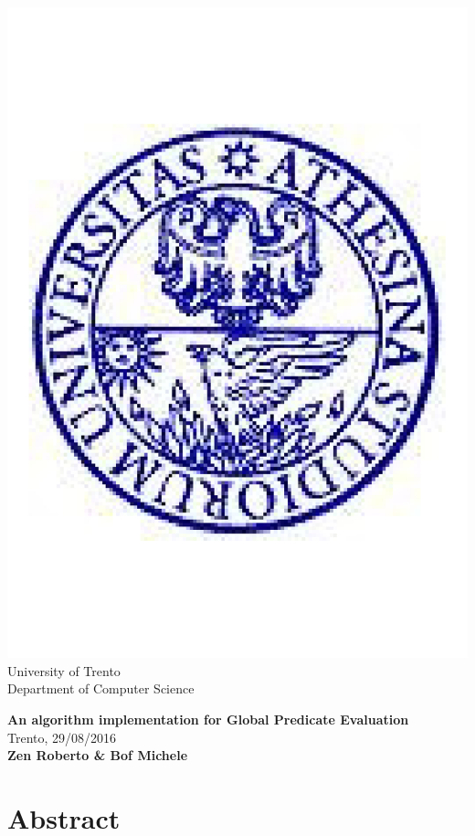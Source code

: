 \begin{titlepage}
\thispagestyle{plain}

\begin{center}
	\includegraphics[scale=0.12]{unitnlogo}	\\
	University of Trento	\\
	\small {Department of Computer Science}	\\[2cm]
\end{center}

{\centering
\textbf{\Huge An algorithm implementation for Global Predicate Evaluation}\\[1cm]
\small{Trento, 29/08/2016}	\\[1cm]
\textbf{Zen Roberto \& Bof Michele}

}
\vfill

\section*{Abstract}



\end{titlepage}
